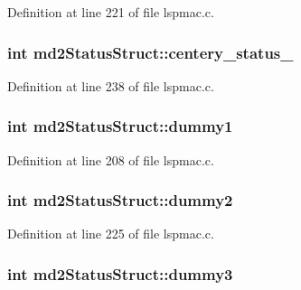 Definition at line 221 of file lspmac.\-c.

\hypertarget{structmd2StatusStruct_aa242098c185cce8f852cd6e081ef0b1d}{
\subsubsection[{centery\-\_\-status\-\_\-2}]{\setlength{\rightskip}{0pt plus 5cm}int md2\-Status\-Struct\-::centery\-\_\-status\-\_}}\label{structmd2StatusStruct_aa242098c185cce8f852cd6e081ef0b1d}


Definition at line 238 of file lspmac.\-c.

\hypertarget{structmd2StatusStruct_a3a2dff3e6a1a346806a655e8404e0f53}{
\subsubsection[{dummy1}]{\setlength{\rightskip}{0pt plus 5cm}int md2\-Status\-Struct\-::dummy1}}\label{structmd2StatusStruct_a3a2dff3e6a1a346806a655e8404e0f53}


Definition at line 208 of file lspmac.\-c.

\hypertarget{structmd2StatusStruct_a4df936acc498498baba111edb82597a1}{
\subsubsection[{dummy2}]{\setlength{\rightskip}{0pt plus 5cm}int md2\-Status\-Struct\-::dummy2}}\label{structmd2StatusStruct_a4df936acc498498baba111edb82597a1}


Definition at line 225 of file lspmac.\-c.

\hypertarget{structmd2StatusStruct_adb2dc5bdbf99def51018558201508009}{
\subsubsection[{dummy3}]{\setlength{\rightskip}{0pt plus 5cm}int md2\-Status\-Struct\-::dummy3}}\label{structmd2StatusStruct_adb2dc5bdbf99def51018558201508009}


